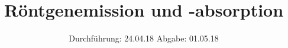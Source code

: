

\subject{V602}
\title{Röntgenemission und -absorption}
\date{%
  Durchführung: 24.04.18
  \hspace{3em}
  Abgabe: 01.05.18
}



\maketitle
\thispagestyle{empty}
\tableofcontents
\newpage




\printbibliography{}


